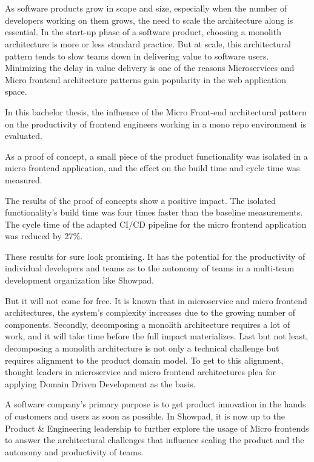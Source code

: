 \chapter*{}
As software products grow in scope and size, especially when the number of developers working on them grows, the need to scale the architecture along is essential. In the start-up phase of a software product, choosing a monolith architecture is more or less standard practice. But at scale, this architectural pattern tends to slow teams down in delivering value to software users. Minimizing the delay in value delivery is one of the reasons Microservices and Micro frontend architecture patterns gain popularity in the web application space. 

In this bachelor thesis, the influence of the Micro Front-end architectural pattern on the productivity of frontend engineers working in a mono repo environment is evaluated. 

As a proof of concept, a small piece of the product functionality was isolated in a micro frontend application, and the effect on the build time and cycle time was measured.

The results of the proof of concepts show a positive impact. The isolated functionality's build time was four times faster than the baseline measurements. The cycle time of the adapted CI/CD pipeline for the micro frontend application was reduced by 27\%.

These results for sure look promising. It has the potential for the productivity of individual developers and teams as to the autonomy of teams in a multi-team development organization like Showpad. 

But it will not come for free. It is known that in microservice and micro frontend architectures, the system's complexity increases due to the growing number of components. Secondly, decomposing a monolith architecture requires a lot of work, and it will take time before the full impact materializes. Last but not least, decomposing a monolith architecture is not only a technical challenge but requires alignment to the product domain model. To get to this alignment, thought leaders in microservice and micro frontend architectures plea for applying Domain Driven Development as the basis.

A software company's primary purpose is to get product innovation in the hands of customers and users as soon as possible. In Showpad, it is now up to the Product \& Engineering leadership to further explore the usage of Micro frontends to answer the architectural challenges that influence scaling the product and the autonomy and productivity of teams.